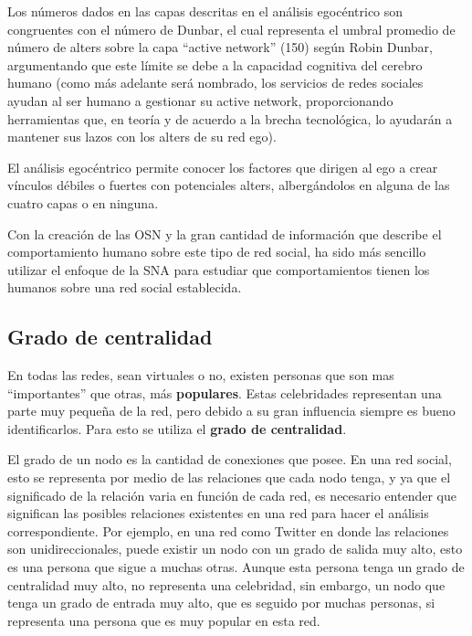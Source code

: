 Los números dados en las capas descritas en el análisis egocéntrico son congruentes con el número de Dunbar, el cual representa el umbral promedio de número de alters sobre la capa “active network” (150) según Robin Dunbar, argumentando que este límite se debe a la capacidad cognitiva del cerebro humano \cite[Pag. 3]{dynamics} (como más adelante será nombrado, los servicios de redes sociales ayudan al ser humano a gestionar su active network, proporcionando herramientas que, en teoría y de acuerdo a la brecha tecnológica, lo ayudarán a mantener sus lazos con los alters de su red ego).

El análisis egocéntrico permite conocer los factores que dirigen al ego a crear vínculos débiles o fuertes con potenciales alters, albergándolos en alguna de las cuatro capas o en ninguna.

Con la creación de las OSN y la gran cantidad de información que describe el comportamiento humano sobre este tipo de red social, ha sido más sencillo utilizar el enfoque de la SNA para estudiar que comportamientos tienen los humanos sobre una red social establecida.

\subsection{Grado de centralidad}

En todas las redes, sean virtuales o no, existen personas que son mas ``importantes'' que otras, más \textbf{populares}. Estas celebridades representan una parte muy pequeña de la red, pero debido a su gran influencia siempre es bueno identificarlos. Para esto se utiliza el \textbf{grado de centralidad}.

El grado de un nodo es la cantidad de conexiones que posee. En una red social, esto se representa por medio de las relaciones que cada nodo tenga, y ya que el significado de la relación varia en función de cada red, es necesario entender que significan las posibles relaciones existentes en una red para hacer el análisis correspondiente. Por ejemplo, en una red como Twitter en donde las relaciones son unidireccionales, puede existir un nodo con un grado de salida muy alto, esto es una persona que sigue a muchas otras. Aunque esta persona tenga un grado de centralidad muy alto, no representa una celebridad, sin embargo, un nodo que tenga un grado de entrada muy alto, que es seguido por muchas personas, si representa una persona que es muy popular en esta red.

